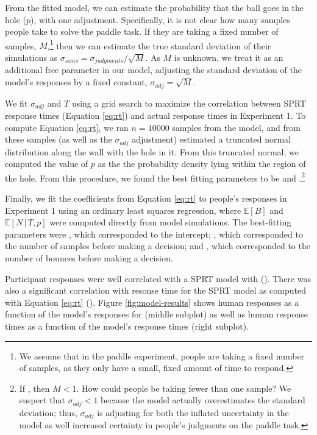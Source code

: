 \documentclass[10pt,letterpaper]{article}
\begin{document}
From the fitted model, we can estimate the probability that the ball goes in the hole ($p$), with one adjustment. Specifically, it is not clear how many samples people take to solve the paddle task. If they are taking a fixed number of samples, $M$,\footnote{We assume that in the paddle experiment, people are taking a fixed number of samples, as they only have a small, fixed amount of time to respond.} then we can estimate the true standard deviation of their simulations as $\sigma_{sims} = \sigma_{judgments} / \sqrt{M}$. As $M$ is unknown, we treat it as an additional free parameter in our model, adjusting the standard deviation of the model's responses by a fixed constant, $\sigma_{adj}=\sqrt{M}$.

We fit $\sigma_{adj}$ and $T$ using a grid search to maximize the correlation between SPRT response times (Equation \ref{eq:rt}) and actual response times in Experiment 1. To compute Equation \ref{eq:rt}, we ran $n=10000$ samples from the model, and from these samples (as well as the $\sigma_{adj}$ adjustment) estimated a truncated normal distribution along the wall with the hole in it. From this truncated normal, we computed the value of $p$ as the the probability density lying within the region of the hole. From this procedure, we found the best fitting parameters to be \sdadj{} and \threshold{}.\footnote{If \sdadj{}, then $M<1$. How could people be taking fewer than one sample? We suspect that $\sigma_{adj}<1$ because the model actually overestimates the standard deviation; thus, $\sigma_{adj}$ is adjusting for both the inflated uncertainty in the model as well increased certainty in people's judgments on the paddle task.}

Finally, we fit the coefficients from Equation \ref{eq:rt} to people's responses in Experiment 1 using an ordinary least squares regression, where $\mathbb{E}[B]$ and $\mathbb{E}[N\,|\,T,p]$ were computed directly from model simulations. The best-fitting parameters were \betazero{}, which corresponded to the intercept; \betaone{}, which corresponded to the number of samples before making a decision; and \betatwo{}, which corresponded to the number of bounces before making a decision.

Participant responses were well correlated with a SPRT model with \threshold{} (\HoleResponseCorr{}). There was also a significant correlation with resonse time for the \threshold{} SPRT model as computed with Equation \ref{eq:rt} (\HoleRTCorr{}). Figure \ref{fig:model-results} shows human responses as a function of the model's responses for \threshold{} (middle subplot) as well as human response times as a function of the model's response times (right subplot).
\end{document}
